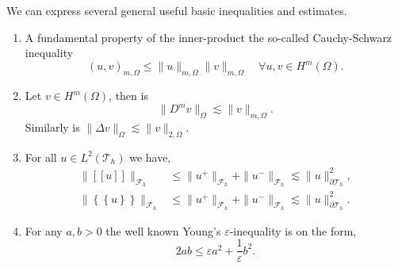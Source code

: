 \documentclass[11pt]{article}
\theoremstyle{remark}
\newcommand{\mean}[1]{\left\{\!\!\left\{#1\right\}\!\!\right\}}
\newcommand{\jump}[1]{\left[\!\left[ #1 \right]\!\right]}
\renewcommand{\le}{\leqslant}
\numberwithin{equation}{section}
\begin{document}
We can express several general useful
basic inequalities and estimates.
\begin{enumerate}[label=(\roman*)]
    \item A fundamental property of the inner-product the so-called Cauchy-Schwarz inequality
        \begin{equation}
            \label{eq:cauchy-schwartz}
     ( u,v)_{m,\Omega   }   \le \| u \|_{m,\Omega    }^{  } \| v \|_{m,\Omega     }^{  }\quad  \forall u,v \in H^{m}( \Omega ).
        \end{equation}

    \item Let $v \in  H^{m}( \Omega ) $, then is
        \begin{equation}
            \| D^{m}v \|_{\Omega   }^{  }  \lesssim \| v \|_{m,\Omega   }^{  }.
        \end{equation}
        Similarly is $\| \Delta  v \|_{\Omega   }^{  } \lesssim \| v \|_{2,\Omega   }^{  }  $.


    \item For all  $u \in L ^{2}( \mathcal{T} _{h})$ we have,
\begin{equation}
    \label{eq:mean_jump_estimate}
    \begin{split}
        \| \jump{  u }   \|_{ \mathcal{F} _{h} }^{  } & \le \|  u^{+}   \|_{ \mathcal{F} _{h} }^{  } +
        \| u^{-}   \|_{ \mathcal{F} _{h} }^{  }  \lesssim  \| u \|_{ \partial\mathcal{T }_{h}  }^{2  },\\
        \| \mean{ u }   \|_{ \mathcal{F} _{h} }^{  } & \le \| u^{+} \|_{ \mathcal{F} _{h}  }^{  } + \| u^{-} \|_{ \mathcal{F} _{h}  }^{  }    \lesssim  \| u \|_{ \partial\mathcal{T }_{h}  }^{2  }.
    \end{split}
\end{equation}

    \item For any $a,b > 0 $ the well known Young's $\varepsilon $-inequality is on the form,
        \begin{equation}
            \label{eq:young-epsilon}
            2ab \le \varepsilon a^2+ \frac{1}{\varepsilon } b^2.
        \end{equation}


\end{enumerate}
\end{document}
